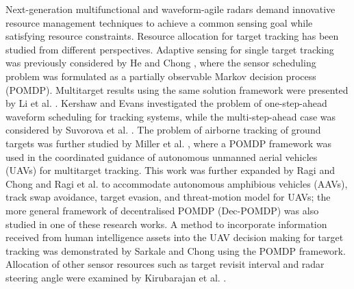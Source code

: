 \documentclass[times]{asjcauth}
\begin{document}
Next-generation multifunctional and waveform-agile radars demand innovative resource management techniques to achieve a common sensing goal while satisfying resource constraints. Resource allocation for target tracking has been studied from different perspectives. Adaptive sensing for single target tracking was previously considered by He and Chong \cite{heandchong}, where the sensor scheduling problem was formulated as a partially observable Markov decision process (POMDP). Multitarget results using the same solution framework were presented by Li et al. \cite{liandchong}. Kershaw and Evans \cite{Evans} investigated the problem of one-step-ahead waveform scheduling for tracking systems, while the multi-step-ahead case was considered by Suvorova et al. \cite{Sofia}. The problem of airborne tracking of ground targets was further studied by Miller et al. \cite{Numerica}, where a POMDP framework was used in the coordinated guidance of autonomous unmanned aerial vehicles (UAVs) for multitarget tracking. This work was further expanded by Ragi and Chong \cite{ragiuav,ragidec} and Ragi et al. \cite{ragiaav} to accommodate autonomous amphibious vehicles (AAVs), track swap avoidance, target evasion, and threat-motion model for UAVs; the more general framework of decentralised POMDP (Dec-POMDP) was also studied in one of these research works. A method to incorporate information received from human intelligence assets into the UAV decision making for target tracking was demonstrated by Sarkale and Chong \cite{sarkale} using the POMDP framework.  Allocation of other sensor resources such as target revisit interval and radar steering angle were examined by Kirubarajan et al. \cite{kirbu}.
\end{document}
